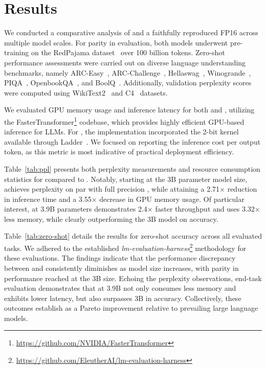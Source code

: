 \section{Results}

We conducted a comparative analysis of  and a faithfully reproduced FP16  across multiple model scales. For parity in evaluation, both models underwent pre-training on the RedPajama dataset~\cite{redpajama} over 100 billion tokens. Zero-shot performance assessments were carried out on diverse language understanding benchmarks, namely ARC-Easy~\cite{arc}, ARC-Challenge~\cite{arc}, Hellaswag~\cite{hellaswag}, Winogrande~\cite{winoGrande}, PIQA~\cite{piqa}, OpenbookQA~\cite{openbookqa}, and BoolQ~\cite{boolq}. Additionally, validation perplexity scores were computed using WikiText2~\cite{wikitext2} and C4~\cite{c4} datasets.

We evaluated GPU memory usage and inference latency for both  and , utilizing the FasterTransformer\footnote{\url{https://github.com/NVIDIA/FasterTransformer}} codebase, which provides highly efficient GPU-based inference for LLMs. For , the implementation incorporated the 2-bit kernel available through Ladder~\cite{ladder}. We focused on reporting the inference cost per output token, as this metric is most indicative of practical deployment efficiency.

Table~\ref{tab:ppl} presents both perplexity measurements and resource consumption statistics for  compared to . Notably, starting at the 3B parameter model size,  achieves perplexity on par with full precision , while attaining a 2.71$\times$ reduction in inference time and a 3.55$\times$ decrease in GPU memory usage. Of particular interest,  at 3.9B parameters demonstrates 2.4$\times$ faster throughput and uses 3.32$\times$ less memory, while clearly outperforming the  3B model on accuracy.

Table~\ref{tab:zero-shot} details the results for zero-shot accuracy across all evaluated tasks. We adhered to the established \emph{lm-evaluation-harness}\footnote{\url{https://github.com/EleutherAI/lm-evaluation-harness}} methodology for these evaluations. The findings indicate that the performance discrepancy between  and  consistently diminishes as model size increases, with parity in performance reached at the 3B size. Echoing the perplexity observations, end-task evaluation demonstrates that  at 3.9B not only consumes less memory and exhibits lower latency, but also surpasses  3B in accuracy. Collectively, these outcomes establish  as a Pareto improvement relative to prevailing large language models.

